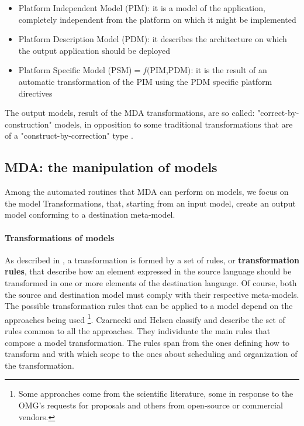 \begin{itemize}
 \item Platform Independent Model (PIM): it is a model of the application, completely independent from the platform on which it might be implemented
 \item Platform Description Model (PDM): it describes the architecture on which the output application should be deployed
 \item Platform Specific Model (PSM)$=f($PIM,PDM$)$: it is the result of an automatic transformation of the PIM using the PDM specific platform directives  
\end{itemize}

The output models, result of the MDA transformations, are so called: "correct-by-construction" models, in opposition to some traditional transformations that are of a "construct-by-correction" type \cite{Marrone}.   


\subsection{MDA: the manipulation of models}
\label{MDAModelManipulation}
Among the automated routines that MDA can perform on models, we focus on the model Transformations, that, starting from an input model, create an output model conforming to a destination meta-model. 

\paragraph{Transformations of models}
As described in \cite{Papa11}, a transformation is formed by a set of rules, or \textbf{transformation rules}, that describe how an element expressed in the source language should be transformed in one or more elements of the destination language.
Of course, both the source and destination model must comply with their respective meta-models.
The possible transformation rules that can be applied to a model depend on the approaches being used \footnote{Some approaches come from the scientific literature, some in response to the OMG's requests for proposals and others from open-source or commercial vendors.}. Czarnecki and Helsen \cite{Czarnecki03classificationof} classify and describe the set of rules common to all the approaches.
They individuate the main rules that compose a model transformation. The rules span from the ones defining how to transform and with which scope to the ones about scheduling and organization of the transformation.

